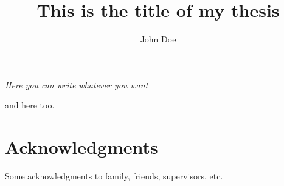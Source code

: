 \documentclass{styles/tthesis}
\title{This is the title of my thesis}
\author{John Doe}
\begin{document}



\thispagestyle{empty}
\mbox{}
\newpage

%
\begin{flushright}
\thispagestyle{empty}
\null{}
{\it Here you can write whatever you want

\vspace{10pt}
and here too.
}
\null
\end{flushright}
%
\thispagestyle{empty}
\mbox{}
\newpage
%
\chapter*{Acknowledgments}

Some acknowledgments to family, friends, supervisors, etc.

\thispagestyle{empty}
\mbox{}
\newpage

\tableofcontents
\listoffigures
\listoftables


\mainmatter









\label{Bibliography}


\end{document}
